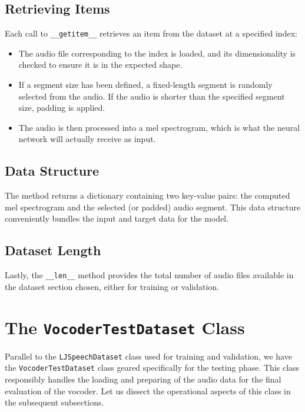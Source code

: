 \documentclass[a4paper]{article}
\begin{document}
\subsection{Retrieving Items}

Each call to \texttt{\_\_getitem\_\_} retrieves an item from the dataset at a specified index:
\begin{itemize}
  \item The audio file corresponding to the index is loaded, and its dimensionality is checked to ensure it is in the expected shape.
  \item If a segment size has been defined, a fixed-length segment is randomly selected from the audio. If the audio is shorter than the specified segment size, padding is applied.
  \item The audio is then processed into a mel spectrogram, which is what the neural network will actually receive as input.
\end{itemize}

\subsection{Data Structure}

The method returns a dictionary containing two key-value pairs: the computed mel spectrogram and the selected (or padded) audio segment. This data structure conveniently bundles the input and target data for the model.

\subsection{Dataset Length}

Lastly, the \texttt{\_\_len\_\_} method provides the total number of audio files available in the dataset section chosen, either for training or validation.




\section{The \texttt{VocoderTestDataset} Class}

Parallel to the \texttt{LJSpeechDataset} class used for training and validation, we have the \texttt{VocoderTestDataset} class geared specifically for the testing phase. This class responsibly handles the loading and preparing of the audio data for the final evaluation of the vocoder. Let us dissect the operational aspects of this class in the subsequent subsections.
\end{document}
